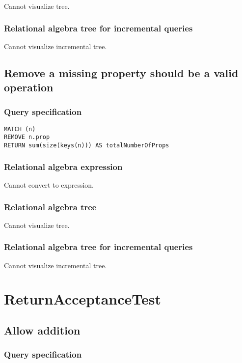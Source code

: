 Cannot visualize tree.

\subsubsection*{Relational algebra tree for incremental queries}

Cannot visualize incremental tree.

\subsection{Remove a missing property should be a valid operation}

\subsubsection*{Query specification}

\begin{lstlisting}
MATCH (n)
REMOVE n.prop
RETURN sum(size(keys(n))) AS totalNumberOfProps
\end{lstlisting}

\subsubsection*{Relational algebra expression}

Cannot convert to expression.

\subsubsection*{Relational algebra tree}

Cannot visualize tree.

\subsubsection*{Relational algebra tree for incremental queries}

Cannot visualize incremental tree.

\section{ReturnAcceptanceTest}

\subsection{Allow addition}

\subsubsection*{Query specification}

